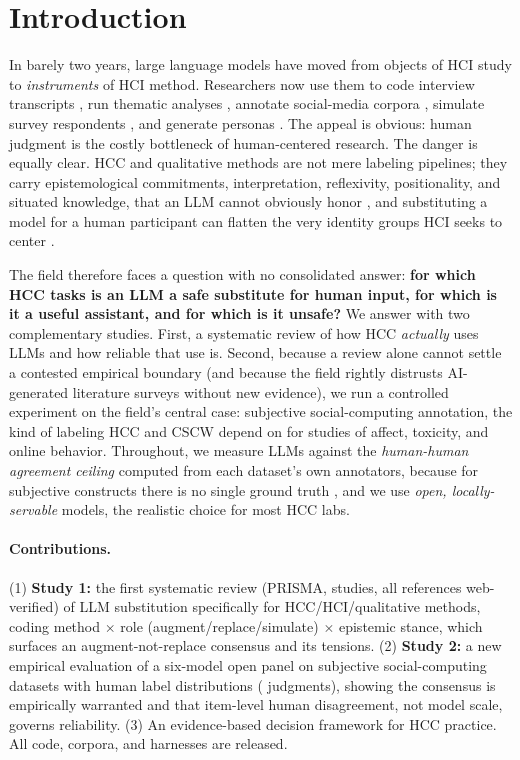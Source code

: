 \section{Introduction}
In barely two years, large language models have moved from objects of HCI study to \emph{instruments} of HCI method.
Researchers now use them to code interview transcripts \citep{xiao2023support,gao2024collabcoder}, run thematic
analyses \citep{depaoli2023inductive,dai2023llminloop}, annotate social-media corpora
\citep{gilardi2023chatgpt,tornberg2023political}, simulate survey respondents \citep{argyle2023outofone}, and
generate personas \citep{salminen2024deusexmachina}. The appeal is obvious: human judgment is the costly bottleneck
of human-centered research. The danger is equally clear. HCC and qualitative methods are not mere labeling
pipelines; they carry epistemological commitments, interpretation, reflexivity, positionality, and situated
knowledge, that an LLM cannot obviously honor \citep{schroeder2025usestensions,davison2024ethics}, and substituting
a model for a human participant can flatten the very identity groups HCI seeks to center
\citep{wang2024flatten,cheng2023compost}.

The field therefore faces a question with no consolidated answer: \textbf{for which HCC tasks is an LLM a safe
substitute for human input, for which is it a useful assistant, and for which is it unsafe?} We answer with two
complementary studies. First, a systematic review of how HCC \emph{actually} uses LLMs and how reliable that use is.
Second, because a review alone cannot settle a contested empirical boundary (and because the field rightly distrusts
AI-generated literature surveys without new evidence), we run a controlled experiment on the field's central case:
subjective social-computing annotation, the kind of labeling HCC and CSCW depend on for studies of affect,
toxicity, and online behavior. Throughout, we measure LLMs against the \emph{human-human agreement ceiling} computed
from each dataset's own annotators, because for subjective constructs there is no single ground truth
\citep{aroyo2015truth,plank2022humanlabel}, and we use \emph{open, locally-servable} models, the realistic choice
for most HCC labs.

\paragraph{Contributions.} (1) \textbf{Study 1:} the first systematic review (PRISMA, \STN{} studies, all references
web-verified) of LLM substitution specifically for HCC/HCI/qualitative methods, coding method $\times$ role
(augment/replace/simulate) $\times$ epistemic stance, which surfaces an augment-not-replace consensus and its
tensions. (2) \textbf{Study 2:} a new empirical evaluation of a six-model open panel on \SOCndat{} subjective
social-computing datasets with human label distributions (\SOCnjudg{} judgments), showing the consensus is
empirically warranted and that item-level human disagreement, not model scale, governs reliability. (3) An
evidence-based decision framework for HCC practice. All code, corpora, and harnesses are released.
